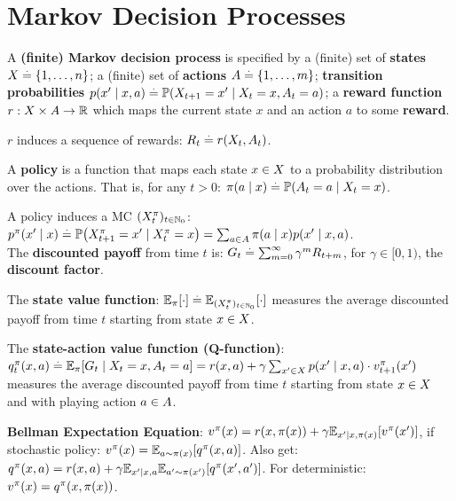 \section{Markov Decision Processes}
\begin{framed}
    A \textbf{(finite) Markov decision process} is specified by a (finite) set of \textbf{states} $X \overset{.}{=} \{1, \dots, n\}$; a (finite) set of \textbf{actions} $A \overset{.}{=} \{1, \dots, m\}$; \textbf{transition probabilities} ${p(x' \mid x, a) \defeq \Pr{X_{t+1} = x' \mid X_t = x, A_t = a}}$; a \textbf{reward function} $r : X \times A \to \mathbb{R}$ which maps the current state $x$ and an action $a$ to some \textbf{reward}.
\end{framed}
$r$ induces a sequence of rewards: $R_t \overset{.}{=} r(X_t, A_t)$.
\begin{framed}
    A \textbf{policy} is a function that maps each state $x \in X$ to a probability distribution over the actions. That is, for any $t > 0$: $\pi(a \mid x) \defeq \Pr{A_t = a \mid X_t = x}$.
\end{framed}
A policy induces a MC $(X_t^\pi)_{t\in\mathbb{N}_0}$: $p^\pi(x' \mid x) \defeq \Pr{X_{t+1}^\pi = x' \mid X_t^\pi = x} = \sum_{a \in \sA} \pi(a \mid x) p(x' \mid x, a)$.\\
The \textbf{discounted payoff} from time $t$ is: $G_t \overset{.}{=} \sum_{m=0}^\infty \gamma^m R_{t+m}$, for $\gamma \in [0, 1)$, the \textbf{discount factor}.
\begin{framed}
    The \textbf{state value function}: $\E[\pi]{\cdot} \defeq \E[(X_t^\pi)_{t\in\Nat_0}]{\cdot}$ measures the average discounted payoff from time $t$ starting from state $x \in X$.
\end{framed}
\begin{framed}
    The \textbf{state-action value function (Q-function)}: $\q[\pi]{x}{a}[t] \defeq \E[\pi]{G_t \mid X_t = x, A_t = a} = r(x, a) + \gamma \sum_{x' \in \sX} p(x' \mid x, a) \cdot \v[\pi]{x'}[t+1]$ measures the average discounted payoff from time $t$ starting from state $x \in X$ and with playing action $a \in A$.
\end{framed}
\begin{framed}
    \textbf{Bellman Expectation Equation}: $\v[\pi]{x} = r(x, \pi(x)) + \gamma \E[x' \mid x, \pi(x)]{\v[\pi]{x'}}$, if stochastic policy: $\v[\pi]{x} = \E[a \sim \pi(x)]{\q[\pi]{x}{a}}$. Also get: $\q[\pi]{x}{a} = r(x, a) + \gamma \E*[x' \mid x, a]{\E[a' \sim \pi(x')]{\q[\pi]{x'}{a'}}}$. For deterministic: $\v[\pi]{x} = \q[\pi]{x}{\pi(x)}$.
\end{framed}
